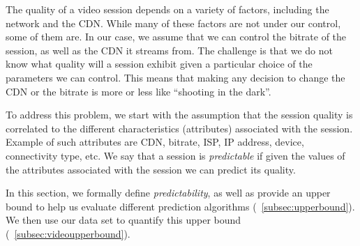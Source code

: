 \label{predictability}


The quality of a video session depends on a variety of factors,
including the network and the CDN. While many of these factors are not
under our control, some of them are. In our case, we assume that we
can control the bitrate of the session, as well as the CDN it streams
from. The challenge is that we do not know what quality will a session
exhibit given a particular choice of the parameters we can
control. This means that making any decision to change the CDN or the
bitrate is more or less like ``shooting in the dark''.

To address this problem, we start with the assumption that the session
quality is correlated to the different characteristics (attributes)
associated with the session. Example of such attributes are CDN,
bitrate, ISP, IP address, device, connectivity type, etc. We say that
a session is {\it predictable} if given the values of the attributes
associated with the session we can predict its quality. 

In this section, we formally define {\it predictability}, as well as
provide an upper bound to help us evaluate different prediction
algorithms (\Section~\ref{subsec:upperbound}). We then use our data
set to quantify this upper bound
(\Section~\ref{subsec:videoupperbound}).




